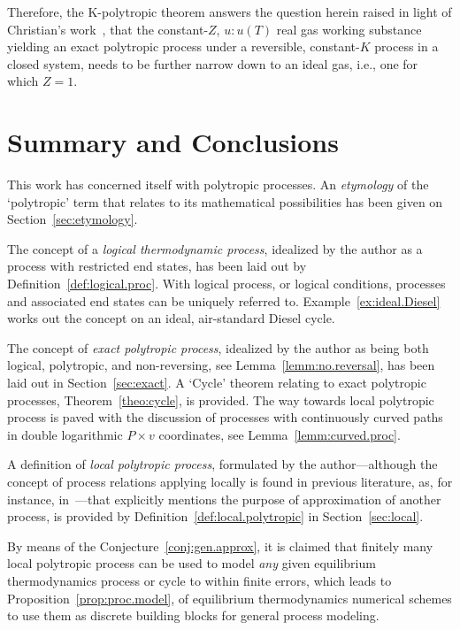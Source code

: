 \documentclass[fleqn,11pt]{SelfArx}
\begin{document}
    Therefore, the  K-polytropic  theorem  answers  the  question  herein  raised  in  light  of
    Christian's    work~\cite{2012-ChristiansJ-IntJMechEngEduc},    that    the    constant-$Z$,
    $u\!:\!u(T)$ real gas working  substance  yielding  an  exact  polytropic  process  under  a
    reversible, constant-$K$ process in a closed system, needs to be further narrow down  to  an
    ideal gas, i.e., one for which $Z=1$.

\section{Summary and Conclusions}

    This work has concerned  itself  with  polytropic  processes.  An  \emph{etymology}  of  the
    `polytropic' term  that  relates  to  its  mathematical  possibilities  has  been  given  on
    Section~\ref{sec:etymology}.

    The concept of a \emph{logical thermodynamic process}, idealized by the author as a  process
    with restricted end states, has been laid  out  by  Definition~\ref{def:logical.proc}.  With
    logical process, or logical conditions, processes and associated end states can be  uniquely
    referred to. Example~\ref{ex:ideal.Diesel} works out the concept on an  ideal,  air-standard
    Diesel cycle.

    The concept of \emph{exact polytropic process},  idealized  by  the  author  as  being  both
    logical, polytropic, and non-reversing, see Lemma~\ref{lemm:no.reversal}, has been laid  out
    in Section~\ref{sec:exact}. A  `Cycle'  theorem  relating  to  exact  polytropic  processes,
    Theorem~\ref{theo:cycle}, is provided. The way towards local  polytropic  process  is  paved
    with the discussion of processes  with  continuously  curved  paths  in  double  logarithmic
    $P\times v$ coordinates, see Lemma~\ref{lemm:curved.proc}.

    A definition of \emph{local polytropic process}, formulated  by  the  author---although  the
    concept of process relations applying locally is  found  in  previous  literature,  as,  for
    instance, in~\cite[p.~175]{2006-BejanA-Wiley}---that  explicitly  mentions  the  purpose  of
    approximation of another process, is provided  by  Definition~\ref{def:local.polytropic}  in
    Section~\ref{sec:local}.

    By means of the Conjecture~\ref{conj:gen.approx}, it is claimed  that  finitely  many  local
    polytropic process can be used to model \emph{any} given equilibrium thermodynamics  process
    or cycle to within finite  errors,  which  leads  to  Proposition~\ref{prop:proc.model},  of
    equilibrium thermodynamics numerical schemes to use them as  discrete  building  blocks  for
    general process modeling.
\end{document}
